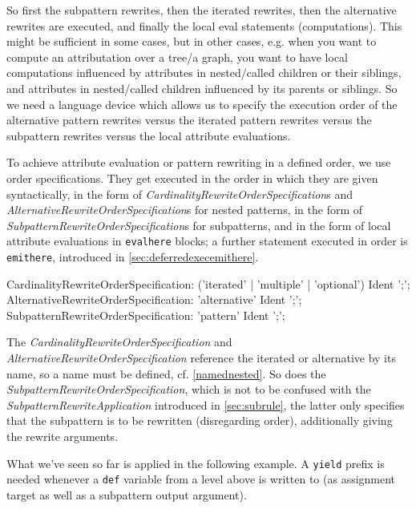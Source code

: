 So first the subpattern rewrites, then the iterated rewrites, then the alternative rewrites are executed, and finally the local eval statements (computations).
This might be sufficient in some cases, but in other cases, e.g. when you want to compute an attributation over a tree/a graph, you want to have local computations influenced by attributes in nested/called children or their siblings, and attributes in nested/called children influenced by its parents or siblings.
So we need a language device which allows us to specify the execution order of the alternative pattern rewrites versus the iterated pattern rewrites versus the subpattern rewrites versus the local attribute evaluations.

To achieve attribute evaluation or pattern rewriting in a defined order, we use order specifications.
They get executed in the order in which they are given syntactically,
in the form of \emph{CardinalityRewriteOrderSpecification}s and \emph{AlternativeRewriteOrderSpecification}s for nested patterns,
in the form of \emph{SubpatternRewriteOrderSpecification}s for subpatterns,
and in the form of local attribute evaluations in \texttt{evalhere} blocks;
a further statement executed in order is \texttt{emithere}, introduced in \ref{sec:deferredexecemithere}. 

\begin{rail}  
  CardinalityRewriteOrderSpecification: 
    ('iterated' | 'multiple' | 'optional') Ident ';';
  AlternativeRewriteOrderSpecification: 
    'alternative' Ident ';';
  SubpatternRewriteOrderSpecification: 
    'pattern' Ident ';';
\end{rail}

The \emph{CardinalityRewriteOrderSpecification} and \emph{AlternativeRewriteOrderSpecification} reference the iterated or alternative by its name, so a name must be defined, cf. \ref{namednested}.
So does the \emph{SubpatternRewriteOrderSpecification}, which is not to be confused with the \emph{SubpatternRewriteApplication} introduced in \ref{sec:subrule}, the latter only specifies that the subpattern is to be rewritten (disregarding order), additionally giving the rewrite arguments.

What we've seen so far is applied in the following example.
A \texttt{yield} prefix is needed whenever a \texttt{def} variable from a level above is written to (as assignment target as well as a subpattern output argument). 

